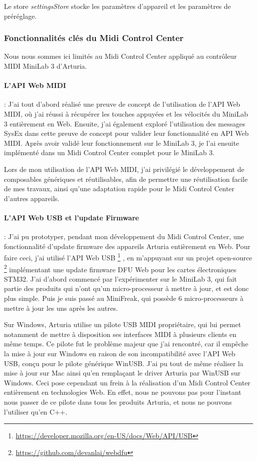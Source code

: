 \documentclass[francais]{rapportPFE}  %
\begin{document}
Le store \textit{settingsStore} stocke les paramètres d'appareil et les paramètres de préréglage.



\subsubsection{Fonctionnalités clés du Midi Control Center}

Nous nous sommes ici limités au Midi Control Center appliqué au contrôleur MIDI MiniLab 3 d'Arturia.

\paragraph{L'API Web MIDI}:
J'ai tout d'abord réalisé une preuve de concept de l'utilisation de l'API Web MIDI, où j'ai réussi à récupérer les touches appuyées et les vélocités du MiniLab 3 entièrement en Web. Ensuite, j'ai également exploré l'utilisation des messages SysEx dans cette preuve de concept pour valider leur fonctionnalité en API Web MIDI.
Après avoir validé leur fonctionnement sur le MiniLab 3, je l'ai ensuite implémenté dans un Midi Control Center complet pour le MiniLab 3. 

Lors de mon utilisation de l'API Web MIDI, j'ai privilégié le développement de composables génériques et réutilisables, afin de permettre une réutilisation facile de mes travaux, ainsi qu'une adaptation rapide pour le Midi Control Center d'autres appareils.


\paragraph{L'API Web USB et l'update Firmware}:
J'ai pu prototyper, pendant mon développement du Midi Control Center, une fonctionnalité d'update firmware des appareils Arturia entièrement en Web. Pour faire ceci, j'ai utilisé l'API Web USB
\footnote{\url{https://developer.mozilla.org/en-US/docs/Web/API/USB}} 
, en m'appuyant sur un projet open-source 
\footnote{\url{https://github.com/devanlai/webdfu}}
implémentant une update firmware DFU Web pour les cartes électroniques STM32.
J'ai d'abord commencé par l'expérimenter sur le MiniLab 3, qui fait partie des produits qui n'ont qu'un micro-processeur à mettre à jour, et est donc plus simple. Puis je suis passé au MiniFreak, qui possède 6 micro-processeurs à mettre à jour les uns après les autres.

Sur Windows, Arturia utilise un pilote USB MIDI propriétaire, qui lui permet notamment de mettre à disposition ses interfaces MIDI à plusieurs clients en même temps. Ce pilote fut le problème majeur que j'ai rencontré, car il empêche la mise à jour sur Windows en raison de son incompatibilité avec l'API Web USB, conçu pour le pilote générique WinUSB. J'ai pu tout de même réaliser la mise à jour sur Mac ainsi qu'en remplaçant le driver Arturia par WinUSB sur Windows. Ceci pose cependant un frein à la réalisation d'un Midi Control Center entièrement en technologies Web. En effet, nous ne pouvons pas pour l'instant nous passer de ce pilote dans tous les produits Arturia, et nous ne pouvons l'utiliser qu'en C++.
\end{document}
